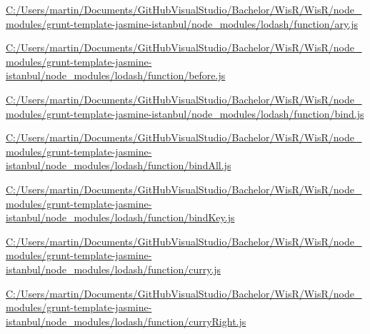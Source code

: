 \begin{DoxyCompactItemize}
\item 
\hyperlink{_c_1_2_users_2martin_2_documents_2_git_hub_visual_studio_2_bachelor_2_wis_r_2_wis_r_2node_module8963c873b48ccfdde42af7824c43afcb}{C\+:/\+Users/martin/\+Documents/\+Git\+Hub\+Visual\+Studio/\+Bachelor/\+Wis\+R/\+Wis\+R/node\+\_\+modules/grunt-\/template-\/jasmine-\/istanbul/node\+\_\+modules/lodash/function/ary.\+js}
\item 
\hyperlink{_c_1_2_users_2martin_2_documents_2_git_hub_visual_studio_2_bachelor_2_wis_r_2_wis_r_2node_module94f9e848c772dbf3794dccf4a19dab5d}{C\+:/\+Users/martin/\+Documents/\+Git\+Hub\+Visual\+Studio/\+Bachelor/\+Wis\+R/\+Wis\+R/node\+\_\+modules/grunt-\/template-\/jasmine-\/istanbul/node\+\_\+modules/lodash/function/before.\+js}
\item 
\hyperlink{_c_1_2_users_2martin_2_documents_2_git_hub_visual_studio_2_bachelor_2_wis_r_2_wis_r_2node_module77594a2ce89c0de1dcc42b99895517ba}{C\+:/\+Users/martin/\+Documents/\+Git\+Hub\+Visual\+Studio/\+Bachelor/\+Wis\+R/\+Wis\+R/node\+\_\+modules/grunt-\/template-\/jasmine-\/istanbul/node\+\_\+modules/lodash/function/bind.\+js}
\item 
\hyperlink{_c_1_2_users_2martin_2_documents_2_git_hub_visual_studio_2_bachelor_2_wis_r_2_wis_r_2node_module7bee99c55a0c9bedfedf9664b54826c7}{C\+:/\+Users/martin/\+Documents/\+Git\+Hub\+Visual\+Studio/\+Bachelor/\+Wis\+R/\+Wis\+R/node\+\_\+modules/grunt-\/template-\/jasmine-\/istanbul/node\+\_\+modules/lodash/function/bind\+All.\+js}
\item 
\hyperlink{_c_1_2_users_2martin_2_documents_2_git_hub_visual_studio_2_bachelor_2_wis_r_2_wis_r_2node_modulee430710d77953569ac6ff4645e79db2b}{C\+:/\+Users/martin/\+Documents/\+Git\+Hub\+Visual\+Studio/\+Bachelor/\+Wis\+R/\+Wis\+R/node\+\_\+modules/grunt-\/template-\/jasmine-\/istanbul/node\+\_\+modules/lodash/function/bind\+Key.\+js}
\item 
\hyperlink{_c_1_2_users_2martin_2_documents_2_git_hub_visual_studio_2_bachelor_2_wis_r_2_wis_r_2node_modulee4e1fdc99f78dbc7143a469d3ba32fcd}{C\+:/\+Users/martin/\+Documents/\+Git\+Hub\+Visual\+Studio/\+Bachelor/\+Wis\+R/\+Wis\+R/node\+\_\+modules/grunt-\/template-\/jasmine-\/istanbul/node\+\_\+modules/lodash/function/curry.\+js}
\item 
\hyperlink{_c_1_2_users_2martin_2_documents_2_git_hub_visual_studio_2_bachelor_2_wis_r_2_wis_r_2node_module0e1359e813649b547d561298c94333f1}{C\+:/\+Users/martin/\+Documents/\+Git\+Hub\+Visual\+Studio/\+Bachelor/\+Wis\+R/\+Wis\+R/node\+\_\+modules/grunt-\/template-\/jasmine-\/istanbul/node\+\_\+modules/lodash/function/curry\+Right.\+js}

\end{DoxyCompactItemize}
